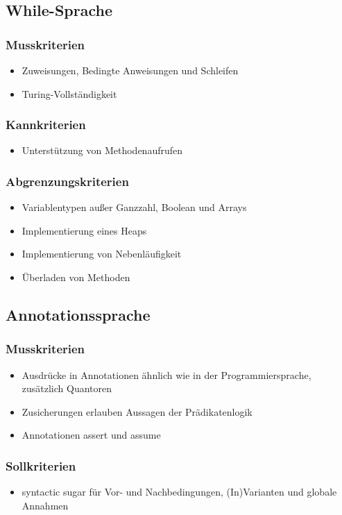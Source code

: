 \documentclass[a4paper,10pt]{article}
\begin{document}
\subsection{While-Sprache}
\subsubsection{Musskriterien}
\begin{itemize}
  \item Zuweisungen, Bedingte Anweisungen und Schleifen
  \item Turing-Vollst\"{a}ndigkeit
\end{itemize}
\subsubsection{Kannkriterien}
\begin{itemize}
  \item Unterst\"{u}tzung von Methodenaufrufen
\end{itemize}
\subsubsection{Abgrenzungskriterien}
\begin{itemize}
  \item Variablentypen au\ss{}er Ganzzahl, Boolean und Arrays
  \item Implementierung eines Heaps
  \item Implementierung von Nebenl\"{a}ufigkeit
  \item \"{U}berladen von Methoden
\end{itemize}

\subsection{Annotationssprache}
\subsubsection{Musskriterien}
\begin{itemize}
  \item Ausdr\"{u}cke in Annotationen \"{a}hnlich wie in der Programmiersprache, zus\"{a}tzlich Quantoren
  \item Zusicherungen erlauben Aussagen der Pr\"{a}dikatenlogik
  \item Annotationen assert und assume
\end{itemize}
\subsubsection{Sollkriterien}
\begin{itemize}
  \item syntactic sugar f\"{u}r Vor- und Nachbedingungen, (In)Varianten und globale Annahmen
\end{itemize}
\end{document}
